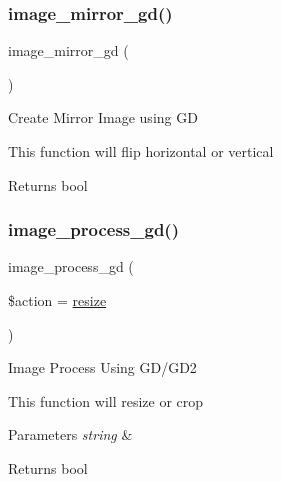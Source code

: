 \subsubsection{\texorpdfstring{image\+\_\+mirror\+\_\+gd()}{image\_mirror\_gd()}}
{\footnotesize\ttfamily image\+\_\+mirror\+\_\+gd (\begin{DoxyParamCaption}{ }\end{DoxyParamCaption})}

Create Mirror Image using GD

This function will flip horizontal or vertical

\begin{DoxyReturn}{Returns}
bool 
\end{DoxyReturn}
\mbox{\label{class_c_i___image__lib_aa8ef6ef7b931a663dd906ce27236c6fd}} 
\subsubsection{\texorpdfstring{image\+\_\+process\+\_\+gd()}{image\_process\_gd()}}
{\footnotesize\ttfamily image\+\_\+process\+\_\+gd (\begin{DoxyParamCaption}\item[{}]{\$action = {\ttfamily \textquotesingle{}\mbox{\hyperlink{class_c_i___image__lib_a94e38a7d478ce07200a52c51497e598e}{resize}}\textquotesingle{}} }\end{DoxyParamCaption})}

Image Process Using G\+D/\+G\+D2

This function will resize or crop


\begin{DoxyParams}{Parameters}
{\em string} & \\
\hline
\end{DoxyParams}
\begin{DoxyReturn}{Returns}
bool 
\end{DoxyReturn}
\mbox{\label{class_c_i___image__lib_a141ec7c2c7cbe7a9a6a913d12fe973da}} 
